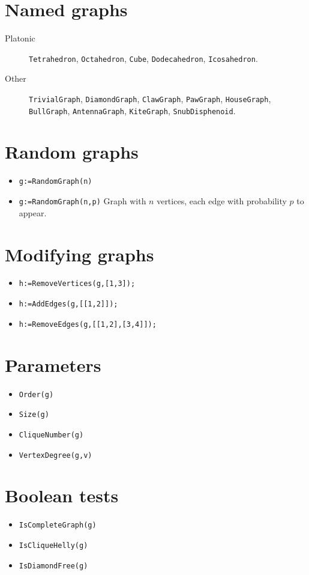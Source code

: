 \documentclass[11pt]{article}
\begin{document}
\begin{multicols}{3}
\section{Named graphs}
\label{sec-3}
\begin{description}
\item[{Platonic}] \verb~Tetrahedron~, \verb~Octahedron~, \verb~Cube~, \verb~Dodecahedron~, \verb~Icosahedron~.
\item[{Other}] \verb~TrivialGraph~, \verb~DiamondGraph~, \verb~ClawGraph~, \verb~PawGraph~,
\verb~HouseGraph~, \verb~BullGraph~, \verb~AntennaGraph~, \verb~KiteGraph~, \verb~SnubDisphenoid~.
\end{description}
\section{Random graphs}
\label{sec-4}

\begin{itemize}
\item \verb~g:=RandomGraph(n)~
\item \verb~g:=RandomGraph(n,p)~ Graph with \(n\) vertices, each edge with
probability \(p\) to appear.
\end{itemize}

\section{Modifying graphs}
\label{sec-5}

\begin{itemize}
\item \verb~h:=RemoveVertices(g,[1,3]);~
\item \verb~h:=AddEdges(g,[[1,2]]);~
\item \verb~h:=RemoveEdges(g,[[1,2],[3,4]]);~
\end{itemize}

\section{Parameters}
\label{sec-6}

\begin{itemize}
\item \verb~Order(g)~
\item \verb~Size(g)~
\item \verb~CliqueNumber(g)~
\item \verb~VertexDegree(g,v)~
\end{itemize}

\section{Boolean tests}
\label{sec-7}
\begin{itemize}
\item \verb~IsCompleteGraph(g)~
\item \verb~IsCliqueHelly(g)~
\item \verb~IsDiamondFree(g)~
\end{itemize}

\end{multicols}
\end{document}
